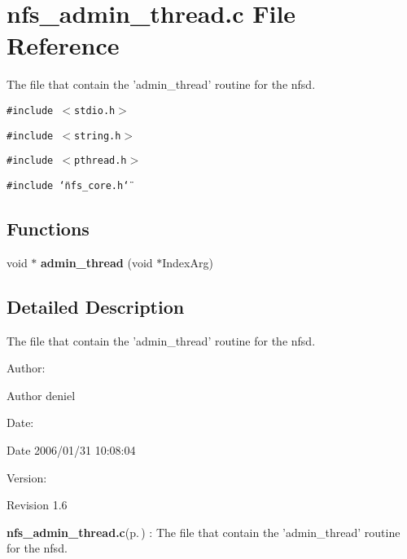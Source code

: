 \section{nfs\_\-admin\_\-thread.c File Reference}
\label{nfs__admin__thread_8c}
The file that contain the 'admin\_\-thread' routine for the nfsd. 

{\tt \#include $<$stdio.h$>$}\par
{\tt \#include $<$string.h$>$}\par
{\tt \#include $<$pthread.h$>$}\par
{\tt \#include \char`\"{}nfs\_\-core.h\char`\"{}}\par
\subsection*{Functions}
\begin{CompactItemize}
\item 
void $\ast$ {\bf admin\_\-thread} (void $\ast$Index\-Arg)
\end{CompactItemize}


\subsection{Detailed Description}
The file that contain the 'admin\_\-thread' routine for the nfsd. 

\begin{Desc}
\item[Author:]\begin{Desc}
\item[Author]deniel \end{Desc}
\end{Desc}
\begin{Desc}
\item[Date:]\begin{Desc}
\item[Date]2006/01/31 10:08:04 \end{Desc}
\end{Desc}
\begin{Desc}
\item[Version:]\begin{Desc}
\item[Revision]1.6 \end{Desc}
\end{Desc}
{\bf nfs\_\-admin\_\-thread.c}{\rm (p.\,\pageref{nfs__admin__thread_8c})} : The file that contain the 'admin\_\-thread' routine for the nfsd.

